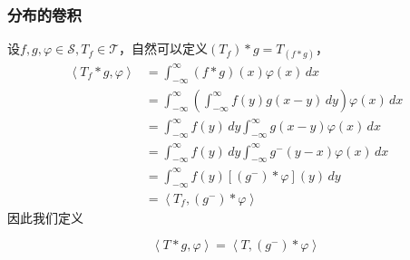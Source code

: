 \subsubsection{分布的卷积}

设$f,g,\varphi\in\mathcal{S} ,T_f\in\mathcal{T} $，自然可以定义$(T_f)*g=T_{(f*g)}$，
\begin{align*}
    \left\langle T_f*g,\varphi\right\rangle & =\int_{-\infty}^{\infty}(f*g)(x)\varphi(x)\,dx                                           \\
                                 & =\int_{-\infty}^{\infty}\left(\int_{-\infty}^{\infty}f(y)g(x-y)\,dy\right)\varphi(x)\,dx \\
                                 & =\int_{-\infty}^{\infty}f(y)\,dy\int_{-\infty}^{\infty}g(x-y)\varphi(x)\,dx              \\
                                 & =\int_{-\infty}^{\infty}f(y)\,dy\int_{-\infty}^{\infty}g^- (y-x)\varphi(x)\,dx           \\
                                 & =\int_{-\infty}^{\infty}f(y)[(g^-) *\varphi](y)\,dy                                      \\
                                 & =\left\langle T_f,(g^-)*\varphi\right\rangle
\end{align*}
因此我们定义\begin{definition}[分布与函数的卷积]
    \[\left\langle T*g,\varphi\right\rangle=\left\langle T,(g^-)*\varphi\right\rangle\]
\end{definition}

